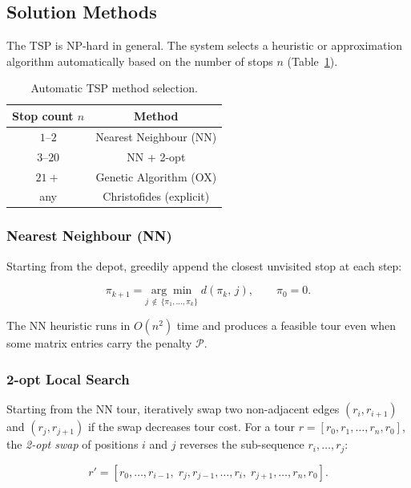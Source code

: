 \documentclass[12pt, a4paper]{article}
\theoremstyle{definition}
\begin{document}
\subsection{Solution Methods}

The TSP is NP-hard in general.  The system selects a heuristic or
approximation algorithm automatically based on the number of stops $n$
(Table~\ref{tab:tsp_methods}).

\begin{table}[h]
  \centering
  \caption{Automatic TSP method selection.}
  \label{tab:tsp_methods}
  \begin{tabular}{cc}
    \toprule
    Stop count $n$ & Method \\
    \midrule
    $1$--$2$  & Nearest Neighbour (NN) \\
    $3$--$20$ & NN + 2-opt \\
    $21+$     & Genetic Algorithm (OX) \\
    any       & Christofides (explicit) \\
    \bottomrule
  \end{tabular}
\end{table}

\subsubsection{Nearest Neighbour (NN)}

Starting from the depot, greedily append the closest unvisited stop at each
step:

\begin{equation}
  \label{eq:nn}
  \pi_{k+1} = \underset{j \,\notin\, \{\pi_1, \ldots, \pi_k\}}{\arg\min}\;
    d(\pi_k,\, j), \qquad \pi_0 = 0.
\end{equation}

The NN heuristic runs in $O(n^2)$ time and produces a feasible tour even
when some matrix entries carry the penalty $\mathcal{P}$.

\subsubsection{2-opt Local Search}

Starting from the NN tour, iteratively swap two non-adjacent edges
$(r_i, r_{i+1})$ and $(r_j, r_{j+1})$ if the swap decreases tour cost.
For a tour $r = [r_0, r_1, \ldots, r_n, r_0]$, the \emph{2-opt swap}
of positions $i$ and $j$ reverses the sub-sequence $r_i, \ldots, r_j$:

\[
  r' = [r_0, \ldots, r_{i-1},\; r_j, r_{j-1}, \ldots, r_i,\; r_{j+1}, \ldots, r_n, r_0].
\]
\end{document}
